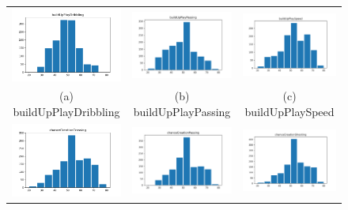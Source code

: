 \documentclass{article}
\begin{document}
\begin{figure}[H]
\centering
\begin{tabular}{ccc}
  \includegraphics[width=40mm]{k-means_graphs/buildUpPlayDribbling.png} &   \includegraphics[width=40mm]{k-means_graphs/buildUpPlayPassing.png} &   \includegraphics[width=40mm]{k-means_graphs/buildUpPlaySpeed.png} \\
(a) buildUpPlayDribbling & (b) buildUpPlayPassing & (c) buildUpPlaySpeed \\[6pt]
 \includegraphics[width=40mm]{k-means_graphs/chanceCreationCrossing.png} &   \includegraphics[width=40mm]{k-means_graphs/chanceCreationPassing.png} &   \includegraphics[width=40mm]{k-means_graphs/chanceCreationShooting.png} \\

\end{tabular}
\end{figure}
\end{document}
